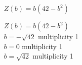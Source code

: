{$Z(b) = b(42 - b^{2})$
}
{$Z(b) = b(42 - b^{2})$\\
$b = -\sqrt{42}$ multiplicity 1\\
$b = 0$ multiplicity 1\\
$b = \sqrt{42}$ multiplicity 1

\begin{center}
\end{center}}